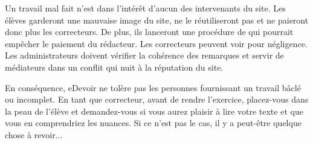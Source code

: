 ﻿Un travail mal fait n’est dans l’intérêt d’aucun des intervenants du site.
Les élèves garderont une mauvaise image du site, ne le réutiliseront pas et ne paieront donc plus les correcteurs. De plus, ils lanceront une procédure de  qui pourrait empêcher le paiement du rédacteur.
Les correcteurs peuvent voir  pour négligence.
Les administrateurs doivent vérifier la cohérence des remarques et servir de médiateurs dans un conflit qui nuit à la réputation du site.

En conséquence, eDevoir ne tolère pas les personnes fournissant un travail bâclé ou incomplet. En tant que correcteur, avant de rendre l’exercice, placez-vous dans la peau de l’élève et demandez-vous si vous aurez plaisir à lire votre texte et que vous en comprendriez les nuances. Si ce n’est pas le cas, il y a peut-être quelque chose à revoir...